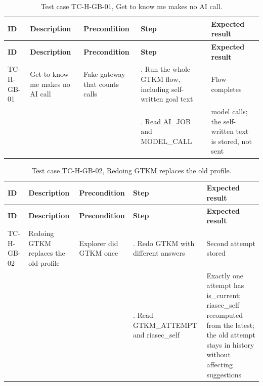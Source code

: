 {\small
\begin{longtable}{|>{\raggedright\arraybackslash}p{}|>{\raggedright\arraybackslash}p{}|>{\raggedright\arraybackslash}p{}|>{\raggedright\arraybackslash}p{}|>{\raggedright\arraybackslash}p{}|}
\caption{Test case TC-H-GB-01, Get to know me makes no AI call.} \\
\hline
\textbf{ID} & \textbf{Description} & \textbf{Precondition} & \textbf{Step} & \textbf{Expected result} \\ \hline
\endfirsthead
\hline
\textbf{ID} & \textbf{Description} & \textbf{Precondition} & \textbf{Step} & \textbf{Expected result} \\ \hline
\endhead
TC-H-GB-01 & Get to know me makes no AI call & Fake gateway that counts calls & 1. Run the whole GTKM flow, including self-written goal text & Flow completes \\ \hline
 &  &  & 2. Read AI\_JOB and MODEL\_CALL & 0 model calls; the self-written text is stored, not sent \\ \hline
\end{longtable}
}

{\small
\begin{longtable}{|>{\raggedright\arraybackslash}p{}|>{\raggedright\arraybackslash}p{}|>{\raggedright\arraybackslash}p{}|>{\raggedright\arraybackslash}p{}|>{\raggedright\arraybackslash}p{}|}
\caption{Test case TC-H-GB-02, Redoing GTKM replaces the old profile.} \\
\hline
\textbf{ID} & \textbf{Description} & \textbf{Precondition} & \textbf{Step} & \textbf{Expected result} \\ \hline
\endfirsthead
\hline
\textbf{ID} & \textbf{Description} & \textbf{Precondition} & \textbf{Step} & \textbf{Expected result} \\ \hline
\endhead
TC-H-GB-02 & Redoing GTKM replaces the old profile & Explorer did GTKM once & 1. Redo GTKM with different answers & Second attempt stored \\ \hline
 &  &  & 2. Read GTKM\_ATTEMPT and riasec\_self & Exactly one attempt has is\_current; riasec\_self recomputed from the latest; the old attempt stays in history without affecting suggestions \\ \hline
\end{longtable}
}


